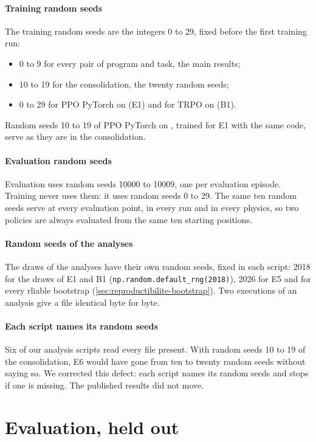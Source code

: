 \paragraph{Training random seeds}
The training random seeds are the integers 0 to 29, fixed before the first training run:
\begin{itemize}
  \item 0 to 9 for every pair of program and task, the main results;
  \item 10 to 19 for the consolidation, the twenty random seeds;
  \item 0 to 29 for PPO PyTorch on  (E1) and for TRPO on  (B1).
\end{itemize}
Random seeds 10 to 19 of PPO PyTorch on , trained for E1 with the same code, serve as they
are in the consolidation.

\paragraph{Evaluation random seeds}
Evaluation uses random seeds \num{10000} to \num{10009}, one per evaluation episode. Training never uses them:
it uses random seeds 0 to 29. The same ten random seeds serve at every evaluation point, in every run and in
every physics, so two policies are always evaluated from the same ten starting positions.

\paragraph{Random seeds of the analyses}
The draws of the analyses have their own random seeds, fixed in each script: 2018 for the draws of E1 and B1
(\texttt{np.random.default\_rng(2018)}), 2026 for E5 and for every rliable bootstrap
(\cref{sec:reproductibilite-bootstrap}). Two executions of an analysis give a file identical byte for byte.

\paragraph{Each script names its random seeds}
Six of our analysis scripts read every file present. With random seeds 10 to 19 of the consolidation, E6 would
have gone from ten to twenty random seeds without saying so. We corrected this defect: each script names its
random seeds and stops if one is missing. The published results did not move.

\section{Evaluation, held out}\label{sec:evaluation}

